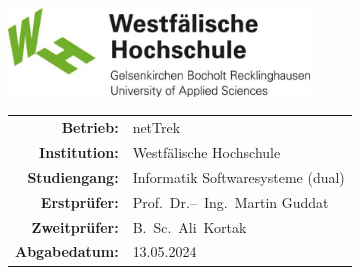 \begin{titlepage}
    \maketitle
    \vspace*{\fill}
    \begin{flushleft}
        
    \end{flushleft}
    \vspace{1cm}
    \begin{flushright}
        \includegraphics[width={0.6\textwidth}]{../assets/img/logos/whs}
    \end{flushright}
    \vspace*{\fill}
    \begin{large}
        \begin{tabular}{r l}
            \textbf{Betrieb:}     & \acl{netTrek}                     \\
            \textbf{Institution:} & Westfälische Hochschule           \\
            \textbf{Studiengang:} & Informatik Softwaresysteme (dual) \\
            \textbf{Erstprüfer:}  & Prof.~Dr.--~Ing.~Martin Guddat    \\
            \textbf{Zweitprüfer:} & B.~Sc.~Ali~Kortak                 \\
            \textbf{Abgabedatum:} & 13.05.2024
        \end{tabular}
    \end{large}
\end{titlepage}